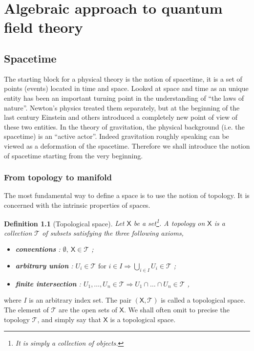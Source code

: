\documentclass[10pt]{book}
\newcommand{\Tcal}{\mathcal{T}}
\newcommand{\Xsf}{\mathsf{X}}
\theoremstyle{break}
\newtheorem{definition}{Definition}
\begin{document}
\part{Algebraic approach to quantum field theory}



\chapter{Spacetime}\label{chap:spacetime}


The starting block for a physical theory is the notion of spacetime, it is a set of points (events) located in time and space. Looked at space and time as an unique entity has been an important turning point in the understanding of ``the laws of nature''. Newton's physics treated them separately, but at the beginning of the last century Einstein and others introduced a completely new point of view of these two entities. In the theory of gravitation, the physical background (i.e. the spacetime) is an ``active actor''. Indeed gravitation roughly speaking can be viewed as a deformation of the spacetime. Therefore we shall introduce the notion of spacetime starting from the very beginning.


\section{From topology to manifold}


The most fundamental way to define a space is to use the notion of topology. It is concerned with the intrinsic properties of spaces.


\begin{definition}[Topological space] 
Let $\Xsf$ be a set\footnote{It is simply a collection of objects.}. A topology on $\Xsf$ is a collection $\Tcal$ of subsets satisfying the three following axioms,%
%
\begin{itemize}
\item \textbf{conventions} : $\emptyset , \ \Xsf \in \Tcal$ ;
\item \textbf{arbitrary union} : $U_i \in \Tcal \mbox{ for } i \in I \Longrightarrow \bigcup_{i\in I} U_i \in \Tcal$ ;
\item \textbf{finite intersection} : $U_1 , \dots , U_n \in \Tcal \Longrightarrow U_1 \cap \dots \cap U_n \in \Tcal$ ,
\end{itemize}
%
\end{definition}
%
where $I$ is an arbitrary index set. The pair $(\Xsf,\Tcal)$ is called a topological space. The element of $\Tcal$ are the open sets of $\Xsf$. We shall often omit to precise the topology $\Tcal$, and simply say that $\Xsf$ is a topological space. 
\end{document}
